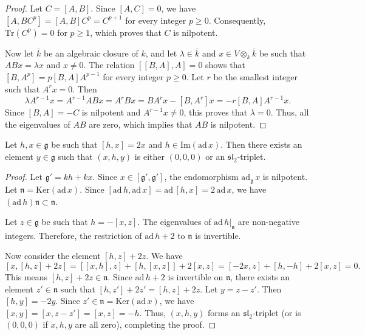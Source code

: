 \begin{proof}
    Let $C = [A, B]$. Since $[A, C] = 0$, we have $[A, BC^p] = [A, B]C^p = C^{p+1}$ for every integer $p \geq 0$. Consequently, $\mathrm{Tr}(C^p) = 0$ for $p \geq 1$, which proves that $C$ is nilpotent.

    Now let $\bar{k}$ be an algebraic closure of $k$, and let $\lambda \in \bar{k}$ and $x \in V \otimes_k \bar{k}$ be such that $ABx = \lambda x$ and $x \neq 0$. The relation $[[B, A], A] = 0$ shows that $[B, A^p] = p[B, A]A^{p-1}$ for every integer $p \geq 0$. Let $r$ be the smallest integer such that $A^r x = 0$. Then
    $$\lambda A^{r-1}x = A^{r-1}ABx = A^r Bx = B A^r x - [B, A^r]x = -r[B, A]A^{r-1}x.$$
    Since $[B, A] = -C$ is nilpotent and $A^{r-1}x \neq 0$, this proves that $\lambda = 0$. Thus, all the eigenvalues of $AB$ are zero, which implies that $AB$ is nilpotent.
\end{proof}

\begin{lemma}
    \label{lem:existence_of_third_element}
    Let $h, x \in \mathfrak{g}$ be such that $[h, x] = 2x$ and $h \in \mathrm{Im}(\mathrm{ad}\,x)$. Then there exists an element $y \in \mathfrak{g}$ such that $(x, h, y)$ is either $(0, 0, 0)$ or an $\mathfrak{sl}_2$-triplet.
\end{lemma}

\begin{proof}
    Let $\mathfrak{g}' = kh + kx$. Since $x \in [\mathfrak{g}', \mathfrak{g}']$, the endomorphism $\mathrm{ad}_{\mathfrak{g}}\,x$ is nilpotent. Let $\mathfrak{n} = \mathrm{Ker}(\mathrm{ad}\,x)$. Since $[\mathrm{ad}\,h, \mathrm{ad}\,x] = \mathrm{ad}\,[h, x] = 2\,\mathrm{ad}\,x$, we have $(\mathrm{ad}\,h)\mathfrak{n} \subset \mathfrak{n}$.

    Let $z \in \mathfrak{g}$ be such that $h = -[x, z]$. The eigenvalues of $\mathrm{ad}\,h|_{\mathfrak{n}}$ are non-negative integers. Therefore, the restriction of $\mathrm{ad}\,h + 2$ to $\mathfrak{n}$ is invertible.

    Now consider the element $[h, z] + 2z$. We have
    $$[x, [h, z] + 2z] = [[x, h], z] + [h, [x, z]] + 2[x, z] = [-2x, z] + [h, -h] + 2[x, z] = 0.$$
    This means $[h, z] + 2z \in \mathfrak{n}$. Since $\mathrm{ad}\,h + 2$ is invertible on $\mathfrak{n}$, there exists an element $z' \in \mathfrak{n}$ such that $[h, z'] + 2z' = [h, z] + 2z$. Let $y = z - z'$. Then $[h, y] = -2y$. Since $z' \in \mathfrak{n} = \mathrm{Ker}(\mathrm{ad}\,x)$, we have $[x, y] = [x, z - z'] = [x, z] = -h$. Thus, $(x, h, y)$ forms an $\mathfrak{sl}_2$-triplet (or is $(0,0,0)$ if $x,h,y$ are all zero), completing the proof.
\end{proof}


